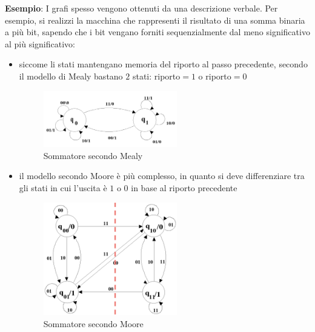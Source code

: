 \documentclass[a4paper]{extarticle}
\begin{document}
\vspace{1em}
\noindent
\textbf{Esempio}: I grafi spesso vengono ottenuti da una descrizione verbale. Per esempio, si realizzi la macchina che rappresenti il risultato di una somma binaria a più bit, sapendo che i bit vengano forniti sequenzialmente dal meno significativo al più significativo:
\begin{itemize}
    \item siccome li stati mantengano memoria del riporto al passo precedente, secondo il modello di Mealy bastano $2$ stati: riporto$=1$ o riporto$=0$
    
    \begin{figure}[H]
        \centering
        \includegraphics[width=0.55\textwidth]{sommatore-2-bit-mealy.png}
        \caption{Sommatore secondo Mealy}
        \label{fig:sommatore_mealy}
    \end{figure}
    
    \item il modello secondo Moore è più complesso, in quanto si deve differenziare tra gli stati in cui l'uscita è $1$ o $0$ in base al riporto precedente
    
    \begin{figure}[H]
        \centering
        \includegraphics[width=0.55\textwidth]{sommatore-2-bit-moore.png}
        \caption{Sommatore secondo Moore}
        \label{fig:sommatore_moore}
    \end{figure}
\end{itemize}

\vspace{1em}
\end{document}

